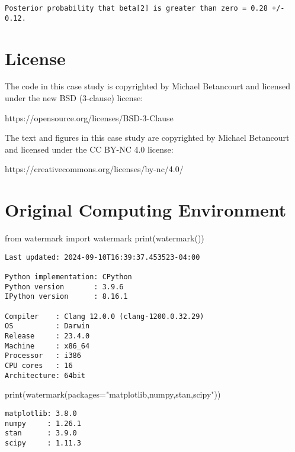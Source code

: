 \documentclass[
  letterpaper,
  DIV=11,
  numbers=noendperiod]{scrartcl}
\newenvironment{Shaded}{\begin{snugshade}}{\end{snugshade}}
\newcommand{\BuiltInTok}[1]{\textcolor[rgb]{0.00,0.23,0.31}{#1}}
\newcommand{\ImportTok}[1]{\textcolor[rgb]{0.00,0.46,0.62}{#1}}
\newcommand{\NormalTok}[1]{\textcolor[rgb]{0.00,0.23,0.31}{#1}}
\newcommand{\OperatorTok}[1]{\textcolor[rgb]{0.37,0.37,0.37}{#1}}
\newcommand{\StringTok}[1]{\textcolor[rgb]{0.13,0.47,0.30}{#1}}
\begin{document}
\begin{verbatim}
Posterior probability that beta[2] is greater than zero = 0.28 +/- 0.12.
\end{verbatim}

\section*{License}\label{license}

The code in this case study is copyrighted by Michael Betancourt and
licensed under the new BSD (3-clause) license:

https://opensource.org/licenses/BSD-3-Clause

The text and figures in this case study are copyrighted by Michael
Betancourt and licensed under the CC BY-NC 4.0 license:

https://creativecommons.org/licenses/by-nc/4.0/

\section*{Original Computing
Environment}\label{original-computing-environment}

\begin{Shaded}
\begin{Highlighting}[]
\ImportTok{from}\NormalTok{ watermark }\ImportTok{import}\NormalTok{ watermark}
\BuiltInTok{print}\NormalTok{(watermark())}
\end{Highlighting}
\end{Shaded}

\begin{verbatim}
Last updated: 2024-09-10T16:39:37.453523-04:00

Python implementation: CPython
Python version       : 3.9.6
IPython version      : 8.16.1

Compiler    : Clang 12.0.0 (clang-1200.0.32.29)
OS          : Darwin
Release     : 23.4.0
Machine     : x86_64
Processor   : i386
CPU cores   : 16
Architecture: 64bit
\end{verbatim}

\begin{Shaded}
\begin{Highlighting}[]
\BuiltInTok{print}\NormalTok{(watermark(packages}\OperatorTok{=}\StringTok{"matplotlib,numpy,stan,scipy"}\NormalTok{))}
\end{Highlighting}
\end{Shaded}

\begin{verbatim}
matplotlib: 3.8.0
numpy     : 1.26.1
stan      : 3.9.0
scipy     : 1.11.3
\end{verbatim}
\end{document}
